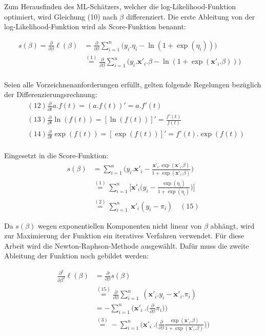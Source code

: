 \documentclass[12pt,]{article}
\begin{document}
Zum Herausfinden des ML-Schätzers, welcher die log-Likelihood-Funktion
optimiert, wird Gleichung (10) nach \(\beta\) differenziert. Die erste
Ableitung von der log-Likelihood-Funktion wird als Score-Funktion
benannt:

\[
\begin{aligned}
s(\beta) = \frac{\partial}{\partial \beta}  \ell(\beta) &= \frac{\partial}{\partial \beta} \sum_{i = 1}^{n} \Big( y_i.\eta_i - \ln (1 + \exp(\eta_i)) \Big) \quad \\
&\mathrel{\overset{(1)}{=}} \frac{\partial}{\partial \beta} \sum_{i = 1}^{n} \Big( y_i.\mathbf{x'}_i.\beta  - \ln (1 + \exp(\mathbf{x'}_i.\beta )) \Big) \quad \\ 
\end{aligned}
\]

Seien alle Vorzeichnenanforderungen erfüllt, gelten folgende Regelungen
bezüglich der Differenzierungsrechnung: \[
\begin{aligned}
&(12) \frac{\partial}{\partial t} a.f(t) = (a.f(t))' = a.f'(t) \\
&(13) \frac{\partial}{\partial t} \ln(f(t)) = [\ln(f(t))]' = \frac{f'(t)}{f(t)} \\ 
&(14) \frac{\partial}{\partial t} \exp(f(t)) = [\exp(f(t))]' = f'(t).\exp(f(t)) \\
\end{aligned}
\]

Eingesetzt in die Score-Funktion: \[
\begin{aligned}
s(\beta) &= \sum_{i = 1}^{n} \Bigg( y_i.\mathbf{x'}_i - \frac{\mathbf{x'}_i.\exp(\mathbf{x'}_i.\beta)}{1 + \exp(\mathbf{x'}_i.\beta)} \Bigg) \\
&\mathrel{\overset{(1)}{=}}\sum_{i = 1}^{n} \Bigg[ \mathbf{x'}_i \Bigg( y_i - \frac{\exp(\eta_i)}{1 + \exp(\eta_i)} \Bigg) \Bigg] \\
&\mathrel{\overset{(2)}{=}}  \sum_{i = 1}^{n} \ \mathbf{x'}_i ( y_i - \pi_i) \quad (15)
\end{aligned}
\]

Da \(s(\beta)\) wegen exponentiellen Komponenten nicht linear von
\(\beta\) abhängt, wird zur Maximierung der Funktion ein iteratives
Verfahren verwendet. Für diese Arbeit wird die Newton-Raphson-Methode
ausgewählt. Dafür muss die zweite Ableitung der Funktion noch gebildet
werden:

\[
\begin{aligned}
\frac{\partial^2}{\partial \beta^2} \ell(\beta) &= \frac{\partial}{\partial \beta} s(\beta) \\ 
&\mathrel{\overset{(15)}{=}} \frac{\partial}{\partial \beta} \sum_{i = 1}^{n} \ (\mathbf{x'}_i.y_i - \mathbf{x'}_i.\pi_i) \\
&= - \sum_{i = 1}^{n} \Bigg( \mathbf{x'}_i \ .  \Big(\frac{\partial}{\partial \beta} \pi_i \Big) \Bigg) \\
&\mathrel{\overset{(3)}{=}} - \sum_{i = 1}^{n} \Bigg( \mathbf{x'}_i \ .  \Big(\frac{\partial}{\partial \beta} \frac{\exp(\mathbf{x'}_i.\beta)}{1+\exp(\mathbf{x'}_i.\beta)} \Big) \Bigg) \\
\end{aligned}
\]
\end{document}
